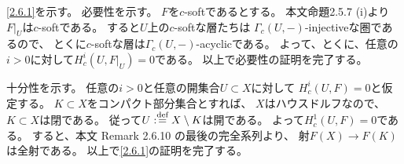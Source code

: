 \documentclass[uplatex,dvipdfmx]{jsarticle}
\makeatletter
\theoremstyle{definition}
\renewenvironment{proof}[1][\proofname]{
  \pushQED{\qed}%
  \normalfont \topsep6\p@\@plus6\p@\relax
  \trivlist
  \item[\hskip\labelsep
    #1\@addpunct{\textbf{.}}]\ignorespaces
}{%
  \popQED\endtrivlist\@endpefalse
}
\providecommand{\proofname}{証明}
\def\dfn{:\overset{\mbox{{\scriptsize def}}}{=}}
\makeatother
\begin{document}
\begin{proof}
  \ref{2.6.1}を示す。
  必要性を示す。
  \(F\)を\(c\)-softであるとする。
  本文命題2.5.7 (i)より\(F|_U\)は\(c\)-softである。
  すると\(U\)上の\(c\)-softな層たちは
  \(\Gamma_c(U,-)\)-injectiveな圏であるので、
  とくに\(c\)-softな層は\(\Gamma_c(U,-)\)-acyclicである。
  よって、とくに、任意の\(i>0\)に対して\(H^i_c(U,F|_U)=0\)である。
  以上で必要性の証明を完了する。

  十分性を示す。
  任意の\(i>0\)と任意の開集合\(U\subset X\)に対して
  \(H^i_c(U,F)=0\)と仮定する。
  \(K\subset X\)をコンパクト部分集合とすれば、
  \(X\)はハウスドルフなので、\(K\subset X\)は閉である。
  従って\(U\dfn X\setminus K\)は開である。
  よって\(H^1_c(U,F)=0\)である。
  すると、本文 Remark 2.6.10 の最後の完全系列より、
  射\(F(X)\to F(K)\)は全射である。
  以上で\ref{2.6.1}の証明を完了する。


\end{proof}
\end{document}
